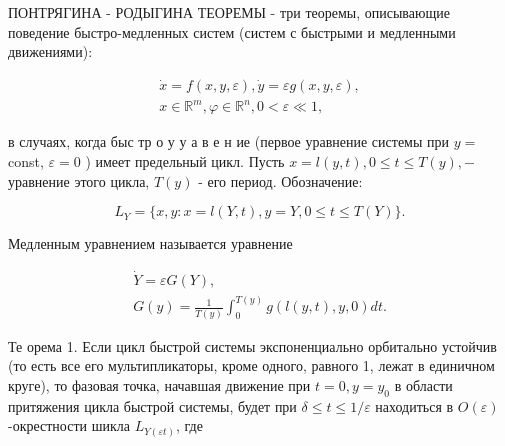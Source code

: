 \documentclass[10pt]{article}
\begin{document}
ПОНТРЯГИНА - РОДЫГИНА ТЕОРЕМЫ - три теоремы, описывающие поведение быстро-медленных систем (систем с быстрыми и медленными движениями):



\[

\begin{gathered}

\dot{x}=f(x, y, \varepsilon), \dot{y}=\varepsilon g(x, y, \varepsilon), \\

x \in \mathbb{R}^{m}, \varphi \in \mathbb{R}^{n}, 0<\varepsilon \ll 1,

\end{gathered}

\]



в случаях, когда быс тр о у у а в е н ие (первое уравнение системы при $y=$ const, $\varepsilon=0$ ) имеет предельный цикл. Пусть $x=l(y, t), 0 \leqslant t \leqslant T(y),-$ уравнение этого цикла, $T(y)$ - его период. Обозначение:



\[

L_{Y}=\{x, y: x=l(Y, t), y=Y, 0 \leqslant t \leqslant T(Y)\} .

\]



Медленным уравнением называется уравнение



\[

\begin{gathered}

\dot{Y}=\varepsilon G(Y), \\

G(y)=\frac{1}{T(y)} \int_{0}^{T(y)} g(l(y, t), y, 0) d t .

\end{gathered}

\]



Те орема 1. Если цикл быстрой системы экспоненциально орбитально устойчив (то есть все его мультипликаторы, кроме одного, равного 1, лежат в единичном круге), то фазовая точка, начавшая движение при $t=0, y=y_{0}$ в области притяжения цикла быстрой системы, будет при $\delta \leqslant t \leqslant 1 / \varepsilon$ находиться в $O(\varepsilon)$-окрестности шикла $L_{Y(\varepsilon t)}$, где
\end{document}

